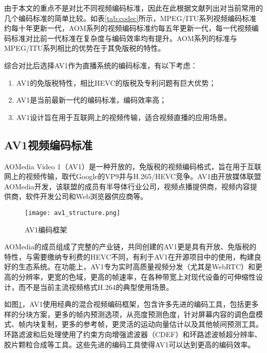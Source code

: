 由于本文的重点不是对比不同视频编码标准，因此在此根据文献\cite{groisCodingEfficiencyComparison2016, akyaziComparisonCompressionEfficiency2018a, zhangComparingVVCHEVC2020}列出对当前常用的几个编码标准的简单比较。如表\ref{tab:codec}所示，MPEG/ITU系列视频编码标准约每十年更新一代，AOM系列的视频编码标准约每五年更新一代，每一代视频编码标准对比前一代标准在复杂度与编码效率均有提升。AOM系列的标准与MPEG/ITU系列相比的优势在于其免版税的特性。

综合对比后选择AV1作为直播系统的编码标准，有以下考虑：
\begin{enumerate} [label=\arabic*)]
  \item AV1的免版税特性，相比HEVC的版税及专利问题有巨大优势；
  \item AV1是当前最新一代的编码标准，编码效率高；
  \item AV1设计旨在用于互联网上的视频传输，适合视频直播的应用场景。
\end{enumerate}

\subsection{AV1视频编码标准}

AOMedia Video 1\cite{rivazAV1BitstreamDecoding2019}（AV1）是一种开放的，免版税的视频编码格式，旨在用于互联网上的视频传输，取代Google的VP9并与H.265/HEVC竞争。AV1由开放媒体联盟AOMedia开发，该联盟的成员有半导体行业公司，视频点播提供商，视频内容提供商，软件开发公司和Web浏览器供应商等。

\begin{figure}[!htp]
	\centering
	\texttt{[image: av1\_structure.png]}
	\caption{AV1编码框架\cite{trowAV1ImplementationPerformance2020}}
	\label{fig:av1-structure}
\end{figure}

AOMedia的成员组成了完整的产业链，共同创建的AV1更是具有开放、免版税的特性，与需要缴纳专利费的HEVC不同，有利于AV1在开源项目中的使用，构建良好的生态系统。在功能上，AV1专为实时高质量视频分发（尤其是WebRTC）和更高的分辨率，更宽的色域，更高的帧速率，在各种带宽上对现代设备的可伸缩性设计，而不是当前主流视频格式H.264的典型使用场景。

如图\ref{fig:av1-structure}，AV1使用经典的混合视频编码框架，包含许多先进的编码工具\cite{chenOverviewCoreCoding2018}，包括更多样的分块方案，更多的帧内预测选项，从亮度预测色度\cite{trudeauPredictingChromaLuma2018a}，针对屏幕内容的调色盘模式、帧内块复制\cite{liIntraBlockCopy2018}，更多的参考帧\cite{linEfficientAV1Video2018}，更灵活的运动向量估计以及其他帧间预测工具。环路滤波和后处理使用了约束方向增强滤波器（CDEF）\cite{midtskogenAv1ConstrainedDirectional2018}和环路滤波帧超分辨率\cite{joshiInloopFrameSuperresolution2019}、胶片颗粒合成\cite{norkinFilmGrainSynthesis2018}等工具。这些先进的编码工具使得AV1可以达到更高的编码效率。

